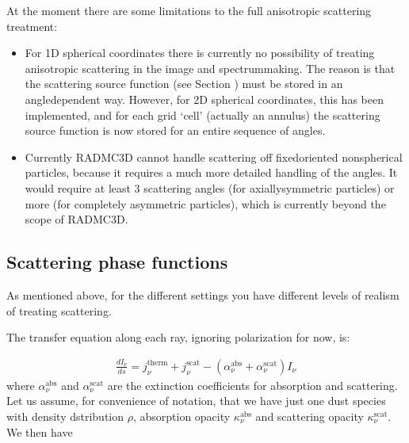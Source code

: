 \documentclass[letterpaper,10pt,english]{sphinxmanual}
\begin{document}
At the moment there are some limitations to the full anisotropic scattering
treatment:
\begin{itemize}
\item {} 

For 1\sphinxhyphen{}D spherical coordinates there is currently no possibility of treating
anisotropic scattering in the image\sphinxhyphen{} and spectrum\sphinxhyphen{}making. The reason is that
the scattering source function (see Section {\hyperref[\detokenize{dustradtrans:sec-scat-monte-carlo}]{}}) must
be stored in an angle\sphinxhyphen{}dependent way.  However, for 2\sphinxhyphen{}D spherical coordinates,
this has been implemented, and for each grid ‘cell’ (actually an annulus) the
scattering source function is now stored for an entire sequence of angles.

\item {} 

Currently RADMC\sphinxhyphen{}3D cannot handle scattering off fixed\sphinxhyphen{}oriented non\sphinxhyphen{}spherical
particles, because it requires a much more detailed handling of the angles. It
would require at least 3 scattering angles (for axially\sphinxhyphen{}symmetric particles)
or more (for completely asymmetric particles), which is currently beyond the
scope of RADMC\sphinxhyphen{}3D.

\end{itemize}


\subsection{Scattering phase functions}
\label{\detokenize{dustradtrans:scattering-phase-functions}}\label{\detokenize{dustradtrans:sec-scat-phasefunc}}
As mentioned above, for the different  settings
you have different levels of realism of treating scattering.

The transfer equation along each ray, ignoring polarization for now, is:

\label{\detokenize{dustradtrans:eq-ray-tracing-rt}}\begin{equation*}
\begin{split}\frac{dI_\nu}{ds} = j_\nu^{\mathrm{therm}} + j_\nu^{\mathrm{scat}}
- (\alpha_\nu^{\mathrm{abs}}+\alpha_\nu^{\mathrm{scat}}) I_\nu\end{split}
\end{equation*}
where \(\alpha_\nu^{\mathrm{abs}}\) and \(\alpha_\nu^{\mathrm{scat}}\) are the
extinction coefficients for absorption and scattering.  Let us assume, for
convenience of notation, that we have just one dust species with density
dstribution \(\rho\), absorption opacity \(\kappa_\nu^{\mathrm{abs}}\) and
scattering opacity \(\kappa_\nu^{\mathrm{scat}}\). We then have
\end{document}
